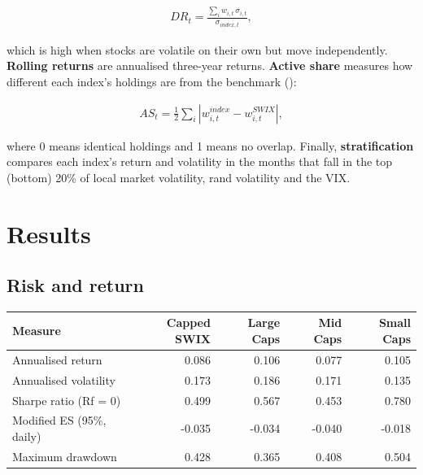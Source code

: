 \documentclass[11pt,preprint]{elsarticle}
\let\origtable\table
\let\endorigtable\endtable
\renewenvironment{table}[1][2] {
    \expandafter\origtable\expandafter[H]
} {
    \endorigtable
}
\numberwithin{equation}{section}
\numberwithin{figure}{section}
\numberwithin{table}{section}
\begin{document}
\begin{align}
DR_t = \frac{\sum_i w_{i,t}\, \sigma_{i,t}}{\sigma_{index,t}}, \label{eq1}
\end{align}

which is high when stocks are volatile on their own but move
independently. \textbf{Rolling returns} are annualised three-year
returns. \textbf{Active share} measures how different each index's
holdings are from the benchmark ():

\begin{align}
AS_t = \frac{1}{2} \sum_i \left| w_{i,t}^{index} - w_{i,t}^{SWIX} \right|, \label{eq2}
\end{align}

where 0 means identical holdings and 1 means no overlap. Finally,
\textbf{stratification} compares each index's return and volatility in
the months that fall in the top (bottom) 20\% of local market
volatility, rand volatility and the VIX.

\section{\texorpdfstring{Results
\label{Results}}{Results }}\label{results}

\subsection{Risk and return}\label{risk-and-return}

\begin{table}[H]
\centering
\caption{Risk and return, January 2015 to September 2026 \label{tab1}} 
\begingroup\footnotesize
\begin{tabular}{lrrrr}
  \hline
Measure & Capped SWIX & Large Caps & Mid Caps & Small Caps \\ 
  \hline
Annualised return & 0.086 & 0.106 & 0.077 & 0.105 \\ 
  Annualised volatility & 0.173 & 0.186 & 0.171 & 0.135 \\ 
  Sharpe ratio (Rf = 0) & 0.499 & 0.567 & 0.453 & 0.780 \\ 
  Modified ES (95\%, daily) & -0.035 & -0.034 & -0.040 & -0.018 \\ 
  Maximum drawdown & 0.428 & 0.365 & 0.408 & 0.504 \\ 
   \hline
\end{tabular}
\endgroup
\end{table}
\end{document}
